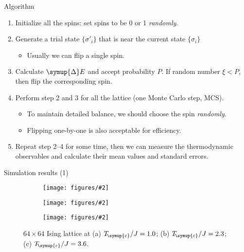 \documentclass[aspectratio=169]{beamer}
\def\Tc{T_{\!\symup{c}}}
\def\incr{{\symup{\Delta}}}
\def\q#1{{\{#1\}}}
\newcommand\imageinput[2][]{\texttt{[image: figures/\#2]}}
\begin{document}
\begin{frame}{Algorithm}
\begin{enumerate}
  \item Initialize all the spins: set spins to be 0 or 1 \emph{randomly}.
  \item Generate a trial state $\q{\sigma'_i}$ that is near the current state $\q{\sigma_i}$
    \begin{itemize}
      \item Usually we can flip a single spin.
    \end{itemize}
  \item Calculate $\incr{E}$ and accept probability $P$. If random number $\xi<P$, then flip the
    corresponding spin.
  \item Perform step 2 and 3 for all the lattice (one Monte Carlo step, MCS).
    \begin{itemize}
      \item To maintain detailed balance, we should choose the spin \emph{randomly}.
      \item Flipping one-by-one is also acceptable for efficiency.
    \end{itemize}
  \item Repeat step 2--4 for some time, then we can measure the thermodynamic observables and
    calculate their mean values and standard errors.
\end{enumerate}
\end{frame}

\begin{frame}{Simulation results (1)}
\begin{figure}
  \centering
  \begin{subfigure}[b]{0.32\textwidth}
    \centering
    \imageinput[width=3cm]{ising-lattice-1-0.pdf}
    \caption{}
  \end{subfigure}
  \begin{subfigure}[b]{0.32\textwidth}
    \centering
    \imageinput[width=3cm]{ising-lattice-2-3.pdf}
    \caption{}
  \end{subfigure}
  \begin{subfigure}[b]{0.32\textwidth}
    \centering
    \imageinput[width=3cm]{ising-lattice-3-6.pdf}
    \caption{}
  \end{subfigure}
  \caption{$64 \times 64$ Ising lattice at (a) $\Tc/J=1.0$; (b) $\Tc/J=2.3$; (c) $\Tc/J=3.6$.}
\end{figure}
\end{frame}
\end{document}
